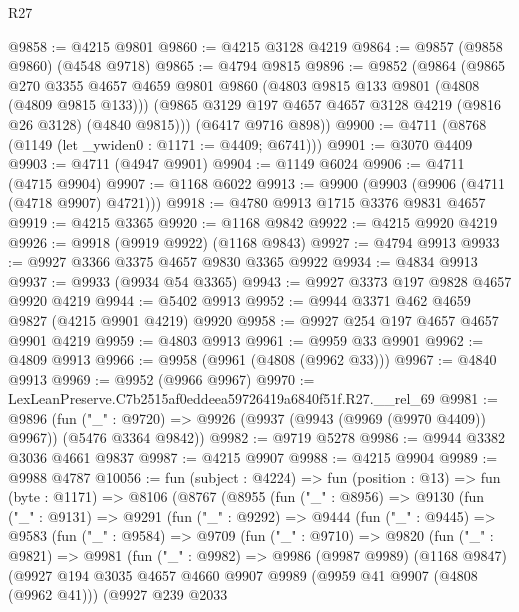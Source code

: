 \begin{lexlean}{R27}
\begin{coremodule}
@9858 := @4215 @9801
@9860 := @4215 @3128 @4219
@9864 := @9857 (@9858 @9860) (@4548 @9718)
@9865 := @4794 @9815
@9896 := @9852
    (@9864
      (@9865
        @270
        @3355
        @4657
        @4659
        @9801
        @9860
        (@4803 @9815 @133 @9801 (@4808 (@4809 @9815 @133)))
        (@9865 @3129 @197 @4657 @4657 @3128 @4219 (@9816 @26 @3128) (@4840 @9815)))
      (@6417 @9716 @898))
@9900 := @4711 (@8768 (@1149 (let _ywiden0 : @1171 := @4409; @6741)))
@9901 := @3070 @4409
@9903 := @4711 (@4947 @9901)
@9904 := @1149 @6024
@9906 := @4711 (@4715 @9904)
@9907 := @1168 @6022
@9913 := @9900 (@9903 (@9906 (@4711 (@4718 @9907) @4721)))
@9918 := @4780 @9913 @1715 @3376 @9831 @4657
@9919 := @4215 @3365
@9920 := @1168 @9842
@9922 := @4215 @9920 @4219
@9926 := @9918 (@9919 @9922) (@1168 @9843)
@9927 := @4794 @9913
@9933 := @9927 @3366 @3375 @4657 @9830 @3365 @9922
@9934 := @4834 @9913
@9937 := @9933 (@9934 @54 @3365)
@9943 := @9927 @3373 @197 @9828 @4657 @9920 @4219
@9944 := @5402 @9913
@9952 := @9944 @3371 @462 @4659 @9827 (@4215 @9901 @4219) @9920
@9958 := @9927 @254 @197 @4657 @4657 @9901 @4219
@9959 := @4803 @9913
@9961 := @9959 @33 @9901
@9962 := @4809 @9913
@9966 := @9958 (@9961 (@4808 (@9962 @33)))
@9967 := @4840 @9913
@9969 := @9952 (@9966 @9967)
@9970 := LexLeanPreserve.C7b2515af0eddeea59726419a6840f51f.R27.__rel_69
@9981 := @9896
    (fun ("_" : @9720) => @9926 (@9937 (@9943 (@9969 (@9970 @4409)) @9967)) (@5476 @3364 @9842))
@9982 := @9719 @5278
@9986 := @9944 @3382 @3036 @4661 @9837
@9987 := @4215 @9907
@9988 := @4215 @9904
@9989 := @9988 @4787
@10056 := fun (subject : @4224) =>
  fun (position : @13) =>
  fun (byte : @1171) =>
  @8106
    (@8767
      (@8955
        (fun ("_" : @8956) =>
        @9130
          (fun ("_" : @9131) =>
          @9291
            (fun ("_" : @9292) =>
            @9444
              (fun ("_" : @9445) =>
              @9583
                (fun ("_" : @9584) =>
                @9709
                  (fun ("_" : @9710) =>
                  @9820
                    (fun ("_" : @9821) =>
                    @9981
                      (fun ("_" : @9982) =>
                      @9986
                        (@9987 @9989)
                        (@1168 @9847)
                        (@9927
                          @194
                          @3035
                          @4657
                          @4660
                          @9907
                          @9989
                          (@9959 @41 @9907 (@4808 (@9962 @41)))
                          (@9927
                            @239
                            @2033

\end{coremodule}
\end{lexlean}
